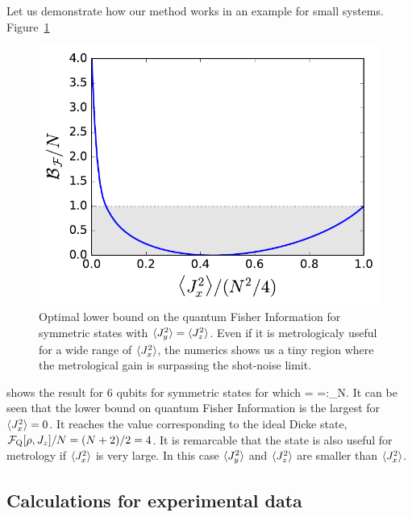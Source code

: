 Let us demonstrate how our method works in an example for small systems.
Figure~\ref{fig:lt-symmetric-dicke-6-bound}
\begin{figure}
  \centering
  \includegraphics[scale=.65]{img/plots/LT_dicke_edge.pdf}
  \caption[6-particles optimal bound on BEC symmetry for the QFI when $\{\expect{J_x^2},\expect{J_y^2},\expect{J_z^2}\}$ are measured]{Optimal lower bound on the quantum Fisher Information for symmetric states with $\langle J_y^2 \rangle=\langle J_z^2 \rangle$. Even if it is metrologicaly useful for a wide range of $\langle J_x^2 \rangle$, the numerics shows us a tiny region where the metrological gain is surpassing the shot-noise limit.}
  \label{fig:lt-symmetric-dicke-6-bound}
\end{figure}
shows the result for 6 qubits for symmetric states for which
\be
  \label{eq:lt-maximum-angular-momentum}
   = =:_N.
\ee
It can be seen that the lower bound on quantum Fisher Information is the largest for $\langle J_x^2 \rangle=0$.
It reaches the value corresponding to the ideal Dicke state, $\mathcal{F}_{\textnormal{Q}}[\rho,J_z]/N=(N+2)/2=4$.
It is remarcable that the state is also useful for metrology if $\langle J_x^2 \rangle$ is very large.
In this case $\langle J_y^2 \rangle$ and $\langle J_z^2 \rangle$ are smaller than $\langle J_x^2 \rangle$.

\subsection{Calculations for experimental data}

